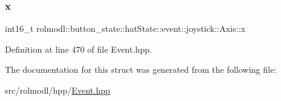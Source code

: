 \subsubsection{\texorpdfstring{x}{x}}
{\footnotesize\ttfamily int16\+\_\+t rolmodl\+::button\+\_\+state\+::hat\+State\+::event\+::joystick\+::\+Axis\+::x}



Definition at line 470 of file Event.\+hpp.



The documentation for this struct was generated from the following file\+:\begin{DoxyCompactItemize}
\item 
src/rolmodl/hpp/\mbox{\hyperlink{_event_8hpp}{Event.\+hpp}}\end{DoxyCompactItemize}
